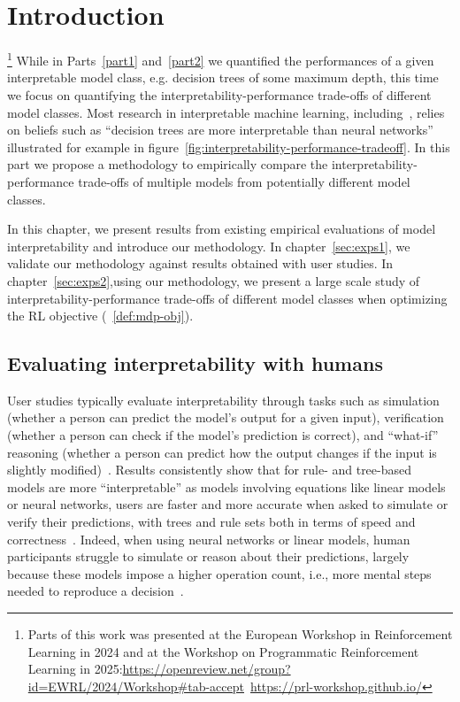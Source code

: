 \chapter{Introduction}\label{sec:intro-methodo}\footnote{Parts of this work was presented at the European Workshop in Reinforcement Learning in 2024 and at the Workshop on Programmatic Reinforcement Learning in 2025:\url{https://openreview.net/group?id=EWRL/2024/Workshop#tab-accept}~\url{https://prl-workshop.github.io/}}
While in Parts~\ref{part1} and~\ref{part2} we quantified the performances of a given interpretable model class, e.g. decision trees of some maximum depth, this time we focus on quantifying the interpretability-performance trade-offs of different model classes.
Most research in interpretable machine learning, including~\cite{topin2021iterative}, relies on beliefs such as ``decision trees are more interpretable than neural networks'' illustrated for example in figure~\ref{fig:interpretability-performance-tradeoff}.
In this part we propose a methodology to empirically compare the interpretability-performance trade-offs of multiple models from potentially different model classes.

In this chapter, we present results from existing empirical evaluations of model interpretability and introduce our methodology.
In chapter~\ref{sec:exps1}, we validate our methodology against results obtained with user studies.
In chapter~\ref{sec:exps2},using our methodology, we present a large scale study of interpretability-performance trade-offs of different model classes when optimizing the RL objective (~\ref{def:mdp-obj}).

\section{Evaluating interpretability with humans}\label{sec:humans}
User studies typically evaluate interpretability through tasks such as simulation (whether a person can predict the model’s output for a given input), verification (whether a person can check if the model’s prediction is correct), and “what-if” reasoning (whether a person can predict how the output changes if the input is slightly modified)~\cite{study-6,study-5}.
Results consistently show that for rule- and tree-based models are more ``interpretable'' as models involving equations like linear models or neural networks, users are faster and more accurate when asked to simulate or verify their predictions, with trees and rule sets both in terms of speed and correctness~\cite{study-0,study-1,study-2,study-3,study-7}.
Indeed, when using neural networks or linear models, human participants struggle to simulate or reason about their predictions, largely because these models impose a higher operation count, i.e., more mental steps needed to reproduce a decision~\cite{study-5}.

